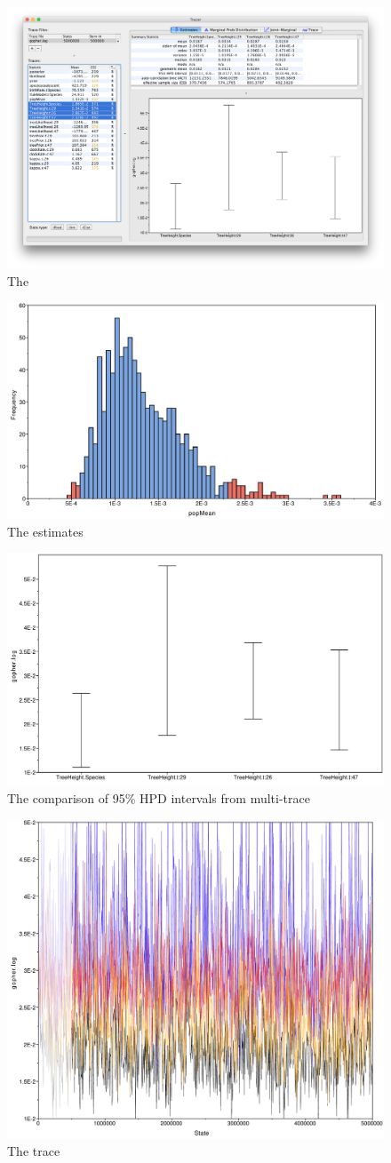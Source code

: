 \documentclass{bioinfo}
\begin{document}

\begin{figure}[H]
\includegraphics[width=.5\textwidth]{../figures/gopher-log.png}  
\caption{The }
\label{fig:front:page}
\end{figure}

\begin{figure}[H]
\includegraphics[width=.5\textwidth]{../figures/estimates.pdf}  
\caption{The estimates}
\label{fig:estimates}
\end{figure}

\begin{figure}[H]
\includegraphics[width=.5\textwidth]{../figures/comp-95HPD.pdf}  
\caption{The comparison of  95\% HPD intervals from multi-trace}
\label{fig:comp95HPD}
\end{figure}

\begin{figure}[H]
\includegraphics[width=.5\textwidth]{../figures/trace.pdf}  
\caption{The trace}
\label{fig:trace}
\end{figure}
\end{document}
